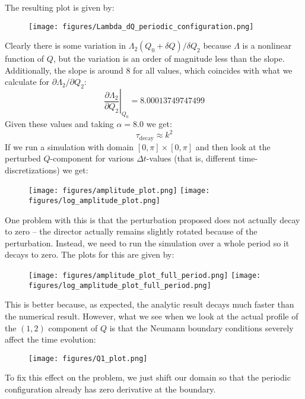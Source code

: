 \documentclass[reqno]{article}
\begin{document}
The resulting plot is given by:
\begin{figure}[h]
    \centering
    \texttt{[image: figures/Lambda\_dQ\_periodic\_configuration.png]}
\end{figure}
Clearly there is some variation in $\Lambda_2(Q_0 + \delta Q) / \delta Q_2$ because $\Lambda$ is a nonlinear function of $Q$, but the variation is an order of magnitude less than the slope.
Additionally, the slope is around 8 for all values, which coincides with what we calculate for $\partial \Lambda_2 / \partial Q_2$:
\begin{equation}
    \left. \frac{\partial \Lambda_2}{\partial Q_2} \right|_{Q_0} = 8.00013749747499
\end{equation}
Given these values and taking $\alpha = 8.0$ we get:
\begin{equation}
    \tau_\text{decay} \approx k^2
\end{equation}
If we run a simulation with domain $[0, \pi]\times [0, \pi]$ and then look at the perturbed $Q$-component for various $\Delta t$-values (that is, different time-discretizations) we get:
\begin{figure}[h]
    \centering
    \texttt{[image: figures/amplitude\_plot.png]}
    \texttt{[image: figures/log\_amplitude\_plot.png]}
\end{figure}

One problem with this is that the perturbation proposed does not actually decay to zero -- the director actually remains slightly rotated because of the perturbation.
Instead, we need to run the simulation over a whole period so it decays to zero. 
The plots for this are given by:
\begin{figure}[h]
    \centering
    \texttt{[image: figures/amplitude\_plot\_full\_period.png]}
    \texttt{[image: figures/log\_amplitude\_plot\_full\_period.png]}
\end{figure}
This is better because, as expected, the analytic result decays much faster than the numerical result.
However, what we see when we look at the actual profile of the $(1, 2)$ component of $Q$ is that the Neumann boundary conditions severely affect the time evolution:
\begin{figure}[h]
    \centering
    \texttt{[image: figures/Q1\_plot.png]}
\end{figure}
To fix this effect on the problem, we just shift our domain so that the periodic configuration already has zero derivative at the boundary.
\end{document}
